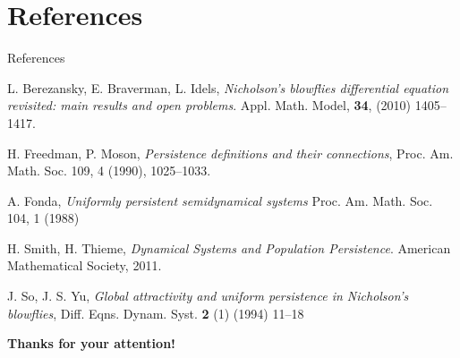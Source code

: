 \documentclass{beamer}
\begin{document}
\section{References}
\begin{frame}[allowframebreaks]{References}
\begin{thebibliography}{99}
{\fontsize{10}{10} \selectfont


\beamertemplatearticlebibitems

 L. Berezansky, E. Braverman, L.  Idels,  
 {\em Nicholson's blowflies differential equation revisited: main results and open problems}. Appl. Math. Model,  {\bf 34}, (2010) 1405--1417.
 
 \beamertemplatearticlebibitems

H. Freedman, P. Moson, {\em Persistence definitions and their connections}, Proc. Am. Math. Soc. 109, 4 (1990), 1025--1033. 
 
\beamertemplatearticlebibitems

A. Fonda, 
{\em Uniformly persistent semidynamical systems}
Proc. Am. Math. Soc.
104, 1 (1988)

\beamertemplatearticlebibitems

H. Smith, H. Thieme, {\em Dynamical Systems
and Population
Persistence}. 
American Mathematical Society, 2011. 

\beamertemplatearticlebibitems

  J. So, J. S. Yu, {\em Global attractivity and uniform persistence in Nicholson's blowflies}, Diff. Eqns. Dynam. Syst. {\bf 2} (1) (1994) 11--18
  
}

\end{thebibliography}
\end{frame}

\begin{frame}
 \begin{center}
  \LARGE{{\bf Thanks for your attention!}}
 \end{center}
\end{frame}
\end{document}
